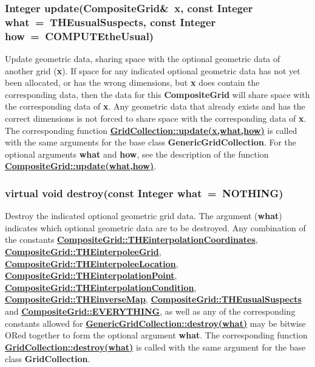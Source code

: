 \documentclass{article}
\begin{document}
  \subsubsection{Integer update(CompositeGrid\&~x, const Integer what~=~THEusualSuspects, const Integer how~=~COMPUTEtheUsual)}
  \label{CompositeGrid::update(x,what,how)}
    Update geometric data, sharing space with the optional geometric data of another grid (\textbf{x}).
    If space for any indicated optional geometric data has not yet been allocated, or has
    the wrong dimensions, but \textbf{x} does contain the corresponding data, then the data
    for this \textbf{CompositeGrid} will share space with the corresponding data of \textbf{x}.
    Any geometric data that already exists and has the correct dimensions
    is not forced to share space with the corresponding data of \textbf{x}.
    The corresponding function
    {\bf{}\hyperref{update(x,what,how)}{update(x,what,how) \rm(\S}{)}{GridCollection::update(x,what,how)}}
    is called with the same arguments for the base class \textbf{GenericGridCollection}.
    For the optional arguments \textbf{what} and \textbf{how}, see the description of the function
    {\bf{}\hyperref{update(what,how)}{update(what,how) \rm(\S}{)}{CompositeGrid::update(what,how)}}.

  \subsubsection{virtual void destroy(const Integer what~=~NOTHING)}
  \label{CompositeGrid::destroy(what)}
    Destroy the indicated optional geometric grid data.
    The argument (\textbf{what}) indicates which optional
    geometric data are to be destroyed.  Any combination of the constants
    {\bf{}\hyperref{THEinterpolationCoordinates}{THEinterpolationCoordinates \rm(\S}{)}{CompositeGrid::THEinterpolationCoordinates}},
    {\bf{}\hyperref{THEinterpoleeGrid}{THEinterpoleeGrid \rm(\S}{)}{CompositeGrid::THEinterpoleeGrid}},
    {\bf{}\hyperref{THEinterpoleeLocation}{THEinterpoleeLocation \rm(\S}{)}{CompositeGrid::THEinterpoleeLocation}},
    {\bf{}\hyperref{THEinterpolationPoint}{THEinterpolationPoint \rm(\S}{)}{CompositeGrid::THEinterpolationPoint}},
    {\bf{}\hyperref{THEinterpolationCondition}{THEinterpolationCondition \rm(\S}{)}{CompositeGrid::THEinterpolationCondition}},
    {\bf{}\hyperref{THEinverseMap}{THEinverseMap \rm(\S}{)}{CompositeGrid::THEinverseMap}},
    {\bf{}\hyperref{THEusualSuspects}{THEusualSuspects \rm(\S}{)}{CompositeGrid::THEusualSuspects}} and
    {\bf{}\hyperref{EVERYTHING}{EVERYTHING \rm(\S}{)}{CompositeGrid::EVERYTHING}},
    as well as any of the corresponding constants allowed for
    {\bf{}\hyperref{GridCollection::destroy(what)}{GenericGridCollection::destroy(what) \rm(\S}{)}{GenericGridCollection::destroy(what)}}
    may be bitwise ORed together to form the optional argument \textbf{what}.
    The corresponding function
    {\bf{}\hyperref{destroy(what)}{destroy(what) \rm(\S}{)}{GridCollection::destroy(what)}}
    is called with the same argument for the base class \textbf{GridCollection}.
\end{document}
